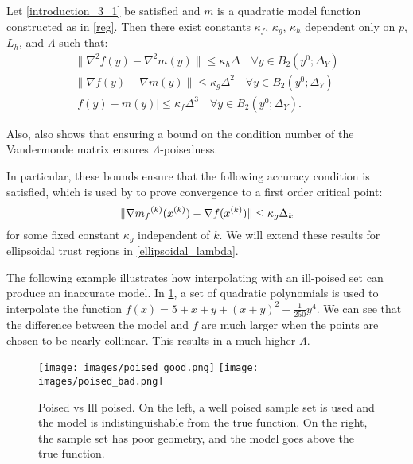 \begin{theorem}
\label{quadratic_errors}
Let \cref{introduction_3_1} be satisfied and $m$ is a quadratic model function constructed as in \cref{reg}. Then there exist constants $\kappa_f$, $\kappa_g$, $\kappa_h$ dependent only on $p$, $L_h$, and $\Lambda$ such that:
\begin{align}
\|\nabla^2 f(y) - \nabla^2 m(y)\| \le \kappa_{h} \Delta \quad \forall y \in B_2(y^0; \Delta_Y) \label{error_in_hessian}\\
\|\nabla f(y) - \nabla m(y)\| \le \kappa_{g} \Delta^2 \quad \forall y \in B_2(y^0; \Delta_Y) \label{error_in_gradient} \\
|f(y) - m(y) | \le \kappa_{f} \Delta^3 \quad \forall y \in B_2(y^0; \Delta_Y). \label{error_in_function} 
\end{align}
\end{theorem}


Also, \cite{DUMMY:intro_book} also shows that ensuring a bound on the condition number of the Vandermonde matrix ensures $\Lambda$-poisedness.

In particular, these bounds ensure that the following accuracy condition is satisfied, which is used by \cite{Conejo:2013:GCT:2620806.2621814} to prove convergence to a first order critical point: 
\begin{equation}
\label{accuracy}
\|\nabla {{m}_f}^{(k)}({x^{(k)}}) - \nabla f({x^{(k)}}) \| \le \kappa_g \Delta_k
\end{equation}
 for some fixed constant $\kappa_g$ independent of $k$.
We will extend these results for ellipsoidal trust regions in \cref{ellipsoidal_lambda}.
 

\ifnum{}
The following example illustrates how interpolating with an ill-poised set can produce an inaccurate model.
In \cref{pvip}, a set of quadratic polynomials is used to interpolate the function $f(x) = 5 + x + y + (x + y) ^ 2 - \frac 1 {250} y ^ 4$.
We can see that the difference between the model and $f$ are much larger when the points are chosen to be nearly collinear.
This results in a much higher $\Lambda$.

\begin{figure}[h]
    \centering
    \texttt{[image: images/poised\_good.png]}
    \texttt{[image: images/poised\_bad.png]}
    \caption{
		Poised vs Ill poised.
		On the left, a well poised sample set is used and the model is indistinguishable from the true function.
		On the right, the sample set has poor geometry, and the model goes above the true function.
	}
    \label{pvip}
\end{figure}
\else
\fi


